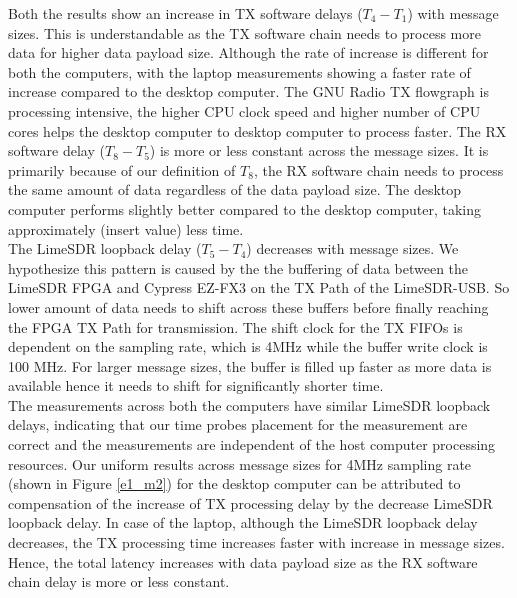 Both the results show an increase in TX software delays ($T_4 - T_1$) with message sizes.
This is understandable as the TX software chain needs to process more data for higher data payload size.
Although the rate of increase is different for both the computers, with the laptop measurements showing a faster rate of increase compared to the desktop computer.
The GNU Radio TX flowgraph is processing intensive, the higher CPU clock speed and higher number of CPU cores helps the desktop computer to desktop computer to process faster.
The RX software delay ($T_8 - T_5$) is more or less constant across the message sizes.
It is primarily because of our definition of $T_8$, the RX software chain needs to process the same amount of data regardless of the data payload size.
The desktop computer performs slightly better compared to the desktop computer, taking approximately (insert value) less time.\\

The LimeSDR loopback delay ($T_5 - T_4$) decreases with message sizes.
We hypothesize this pattern is caused by the the buffering of data between the LimeSDR \ac{FPGA} and Cypress EZ-FX3 on the TX Path of the LimeSDR-USB.
So lower amount of data needs to shift across these buffers before finally reaching the \ac{FPGA} TX Path for transmission.
The shift clock for the TX FIFOs is dependent on the sampling rate, which is 4MHz while the buffer write clock is 100 MHz.
For larger message sizes, the buffer is filled up faster as more data is available hence it needs to shift for significantly shorter time. \\

The measurements across both the computers have similar LimeSDR loopback delays, indicating that our time probes placement for the measurement are correct and the measurements are independent of the host computer processing resources.
Our uniform results across message sizes for 4MHz sampling rate (shown in Figure \ref{e1_m2}) for the desktop computer can be attributed to compensation of the increase of TX processing delay by the decrease LimeSDR loopback delay.
In case of the laptop, although the LimeSDR loopback delay decreases, the TX processing time increases faster with increase in message sizes.
Hence, the total latency increases with data payload size as the RX software chain delay is more or less constant.

